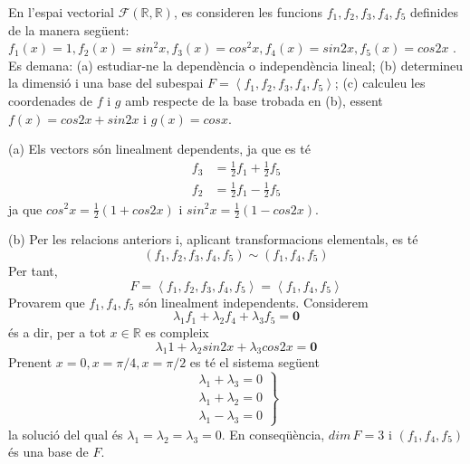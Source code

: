 \begin{exercici}
En l’espai vectorial $\mathcal{F}(\mathbb{R},\mathbb{R})$, es consideren
les funcions $f_{1},f_{2},f_{3},f_{4},f_{5}$ definides de la manera següent: $%
f_{1}(x)=1,f_{2}(x)=sin^{2}x,f_{3}(x)=cos^{2}x,f_{4}(x)=sin2x,f_{5}(x)=cos2x$%
. Es demana: (a) estudiar-ne la dependència o independència lineal; (b)
determineu la dimensió i una base del subespai $F%
=\left\langle f_{1},f_{2},f_{3},f_{4},f_{5}\right\rangle $; (c) calculeu les
coordenades de $f$ i $g$ amb respecte de la base trobada en (b), essent $%
f(x)=cos2x+sin2x$ i $g(x)=cosx$.

\end{exercici}
\begin{solucio}
(a) Els vectors són linealment dependents, ja que es té%
\begin{align*}
f_{3} &=\frac{1}{2}f_{1}+\frac{1}{2}f_{5} \\
f_{2} &=\frac{1}{2}f_{1}-\frac{1}{2}f_{5}
\end{align*}%
ja que $cos^{2}x=\frac{1}{2}(1+cos2x)$ i $sin^{2}x=\frac{1}{2}(1-cos2x)$.

(b) Per les relacions anteriors i, aplicant transformacions elementals,
es té%
\begin{equation*}
\left( f_{1},f_{2},f_{3},f_{4},f_{5}\right) \sim \left(
f_{1},f_{4},f_{5}\right)
\end{equation*}%
Per tant,%
\begin{equation*}
F=\left\langle f_{1},f_{2},f_{3},f_{4},f_{5}\right\rangle
=\left\langle f_{1},f_{4},f_{5}\right\rangle
\end{equation*}%
Provarem que $f_{1},f_{4},f_{5}$ són linealment independents.
Considerem%
\begin{equation*}
\lambda _{1}f_{1}+\lambda _{2}f_{4}+\lambda _{3}f_{5}=\mathbf{0}
\end{equation*}%
és a dir, per a tot $x\in \mathbb{R}$ es compleix%
\begin{equation*}
\lambda _{1}1+\lambda _{2}sin2x+\lambda _{3}cos2x=\mathbf{0}
\end{equation*}%
Prenent $x=0,x=\pi /4,x=\pi /2$ es té el sistema següent%
\begin{equation*}
\left.
\begin{array}{r}
\lambda _{1}+\lambda _{3}=0 \\
\lambda _{1}+\lambda _{2}=0 \\
\lambda _{1}-\lambda _{3}=0%
\end{array}%
\right\}
\end{equation*}%
la solució del qual és $\lambda _{1}=\lambda _{2}=\lambda _{3}=0$. En
conseqüència, $dim\,F=3$ i $(f_{1},f_{4},f_{5})$ és una base de $%
F$.


\end{solucio}
